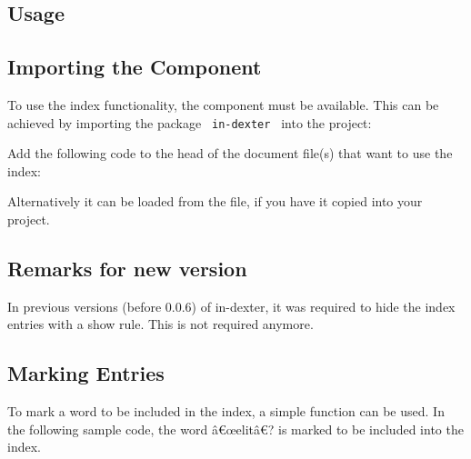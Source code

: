 \subsection{Usage}\label{usage}

\subsection{Importing the Component}\label{importing-the-component}

To use the index functionality, the component must be available. This
can be achieved by importing the package \texttt{\ in-dexter\ } into the
project:

Add the following code to the head of the document file(s) that want to
use the index:

\begin{Shaded}
\begin{Highlighting}[]
\end{Highlighting}
\end{Shaded}

Alternatively it can be loaded from the file, if you have it copied into
your project.

\begin{Shaded}
\begin{Highlighting}[]
\end{Highlighting}
\end{Shaded}

\subsection{Remarks for new version}\label{remarks-for-new-version}

In previous versions (before 0.0.6) of in-dexter, it was required to
hide the index entries with a show rule. This is not required anymore.

\subsection{Marking Entries}\label{marking-entries}

To mark a word to be included in the index, a simple function can be
used. In the following sample code, the word â€œelitâ€? is marked to be
included into the index.

\begin{Shaded}
\begin{Highlighting}[]
\end{Highlighting}
\end{Shaded}

